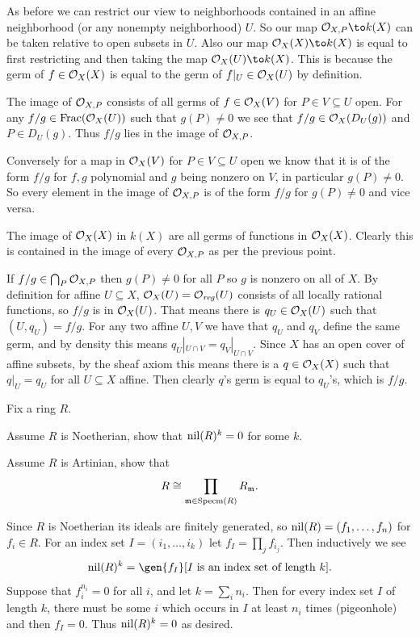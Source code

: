     As before we can restrict our view to neighborhoods contained in an affine neighborhood (or any nonempty neighborhood) $U$.
    So our map $\O_{X,P}\to k(X)$ can be taken relative to open subsets in $U$.
    Also our map $\O_X(X)\to k(X)$ is equal to first restricting and then taking the map $\O_X(U)\to k(X)$.
    This is because the germ of $f\in{{\cal O}}_X(X)$ is equal to the germ of $f|_U\in{{\cal O}}_X(U)$ by definition.

    \item The image of ${{\cal O}}_{X,P}$ consists of all germs of $f\in{{\cal O}}_X(V)$ for $P\in V\subseteq U$ open.
    For any $f/g\in{\rm Frac}({{\cal O}}_X(U))$ such that $g(P)\neq0$ we see that $f/g\in{{\cal O}}_X(D_U(g))$ and $P\in D_U(g)$.
    Thus $f/g$ lies in the image of ${{\cal O}}_{X,P}$.

    Conversely for a map in ${{\cal O}}_X(V)$ for $P\in V\subseteq U$ open we know that it is of the form $f/g$ for $f,g$ polynomial and
    $g$ being nonzero on $V$, in particular $g(P)\neq0$.
    So every element in the image of ${{\cal O}}_{X,P}$ is of the form $f/g$ for $g(P)\neq0$ and vice versa.

    \item The image of ${{\cal O}}_X(X)$ in $k(X)$ are all germs of functions in ${{\cal O}}_X(X)$.
    Clearly this is contained in the image of every ${{\cal O}}_{X,P}$ as per the previous point.

    If $f/g\in\bigcap_P{{\cal O}}_{X,P}$ then $g(P)\neq0$ for all $P$ so $g$ is nonzero on all of $X$.
    By definition for affine $U\subseteq X$, ${{\cal O}}_X(U)={{\cal O}}_{\it reg}(U)$ consists of all locally rational functions, so $f/g$ is in ${{\cal O}}_X(U)$.
    That means there is $q_U\in{{\cal O}}_X(U)$ such that $(U,q_U)=f/g$.
    For any two affine $U,V$ we have that $q_U$ and $q_V$ define the same germ, and by density this means $q_U|_{U\cap V}=q_V|_{U\cap V}$.
    Since $X$ has an open cover of affine subsets, by the sheaf axiom this means there is a $q\in{{\cal O}}_X(X)$ such that $q|_U=q_U$ for all $U\subseteq X$
    affine.
    Then clearly $q$'s germ is equal to $q_U$'s, which is $f/g$.
\eenum

\bprob

    Fix a ring $R$.
    \benum
        \item Assume $R$ is Noetherian, show that ${\rm nil}(R)^k=0$ for some $k$.
        \item Assume $R$ is Artinian, show that
        $$ R \cong \prod_{{{\frak m}}\in{\rm Specm}(R)}R_{{\frak m}} . $$
    \eenum

\eprob

\benum
    \item Since $R$ is Noetherian its ideals are finitely generated, so ${\rm nil}(R)=(f_1,\dots,f_n)$ for $f_i\in R$.
    For an index set $I=(i_1,\dots,i_k)$ let $f_I=\prod_jf_{i_j}$.
    Then inductively we see
    $$ \nil(R)^k = \gen{f_I}[\hbox{$I$ is an index set of length $k$}] . $$
    Suppose that $f_i^{n_i}=0$ for all $i$, and let $k=\sum_in_i$.
    Then for every index set $I$ of length $k$, there must be some $i$ which occurs in $I$ at least $n_i$ times (pigeonhole) and then $f_I=0$.
    Thus ${\rm nil}(R)^k=0$ as desired.

